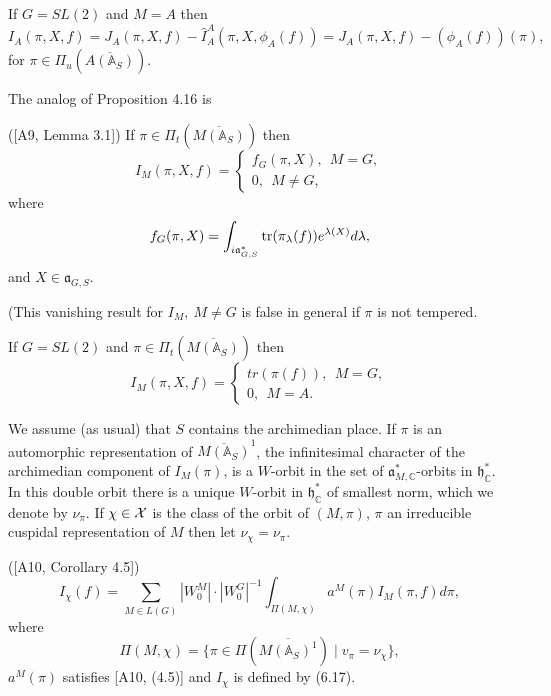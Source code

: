 \begin{example}
If $G=SL(2)$ and $M=A$ then
\[
I_A(\pi,X,f)
=J_A(\pi,X,f)-
\hat{I}_A^A(\pi,X,\phi_A(f))
=J_A(\pi,X,f)-(\phi_A(f))(\pi),
\]
for $\pi\in \Pi_u(\overline{A({\mathbb{A}}_S)})$.
\end{example}

The analog of Proposition 4.16 is

\begin{proposition}
([A9, Lemma 3.1]) If $\pi\in\Pi_t(\overline{M({\mathbb{A}}_S)})$ then
\[
I_M(\pi,X,f)=
\left\{
\begin{array}{c}
 f_G(\pi,X),\ \ M=G,\\
 0,\ \ M\not= G,
\end{array}
\right.
\]
where
\[
f_G(\pi,X)=
\int_{i{\mathfrak{a}}^*_{G,S}}
{\rm tr}(\pi_\lambda(f))e^{\lambda(X)}d\lambda,
\]
and $X\in {\mathfrak{a}}_{G,S}$.
\end{proposition}

(This vanishing result for $I_M,\ M\not=G$ is false in
general if $\pi$ is not tempered.

\begin{example} If $G=SL(2)$ and
$\pi\in\Pi_t(\overline{M({\mathbb{A}}_S)})$ then
\[
I_M(\pi,X,f)=
\left\{
\begin{array}{c}
 tr(\pi(f)),\ \ M=G,\\
 0,\ \ M= A.
\end{array}
\right.
\]
\end{example}

We assume (as usual) that $S$ contains the archimedian place.
If $\pi$ is an automorphic representation of $\overline{M({\mathbb{A}}_S)}^1$,
the infinitesimal character of the archimedian
component of $I_M(\pi)$, is a $W$-orbit in the set of
${\mathfrak{a}}_{M,{\mathbb{C}}}^*$-orbits in ${\mathfrak{h}}_{\mathbb{C}}^*$.
In this double orbit there is a unique
$W$-orbit in ${\mathfrak{h}}_{\mathbb{C}}^*$ of smallest norm, which we denote by
$\nu_\pi$. If $\chi\in {\cal{X}}$ is the class of the orbit of
$(M,\pi)$, $\pi$ an
irreducible cuspidal representation of $M$ then let
$\nu_\chi =\nu_\pi$.

\begin{theorem} ([A10, Corollary 4.5]) 
\[
I_\chi
(f)
=\sum_{M\in L(G)}|W_0^M|\cdot |W_0^G|^{-1}
\int_{\Pi (M,\chi)}a^M(\pi
)I_M(\pi ,f)d\pi ,
\]
where 
\[
\Pi (M,\chi )=
\{\pi \in \Pi (\overline{M({\mathbb{A}}_S)^1})\;|\;v_\pi =\nu_\chi \},
\]
$a^M(\pi )$ satisfies [A10, (4.5)] and $I_\chi$ is
defined by (6.17).
\end{theorem}


